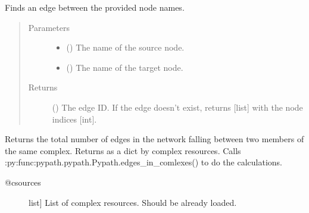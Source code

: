 \documentclass[letterpaper,10pt,english]{sphinxmanual}
\begin{document}
\begin{fulllineitems}
\begin{fulllineitems}
\end{fulllineitems}


\begin{fulllineitems}
\label{\detokenize{main:pypath.main.PyPath.straight_between}}
Finds an edge between the provided node names.
\begin{quote}\begin{description}
\item[{Parameters}] \leavevmode\begin{itemize}
\item {} 
 () \textendash{} The name of the source node.

\item {} 
 () \textendash{} The name of the target node.

\end{itemize}

\item[{Returns}] \leavevmode
() \textendash{} The edge ID. If the edge doesn’t exist, returns
{[}list{]} with the node indices {[}int{]}.

\end{description}\end{quote}

\end{fulllineitems}


\begin{fulllineitems}
\label{\detokenize{main:pypath.main.PyPath.string_effects}}
\end{fulllineitems}


\begin{fulllineitems}
\label{\detokenize{main:pypath.main.PyPath.sum_in_complex}}
Returns the total number of edges in the network falling
between two members of the same complex.
Returns as a dict by complex resources.
Calls :py:func:pypath.pypath.Pypath.edges\_in\_comlexes()
to do the calculations.
\begin{description}
\item[{@csources}] \leavevmode{[}list{]}
List of complex resources. Should be already loaded.


\end{description}
\end{fulllineitems}
\end{fulllineitems}
\end{document}
